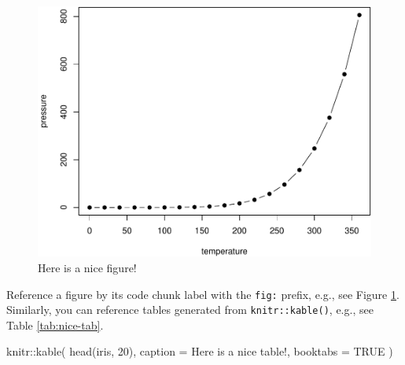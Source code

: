 \documentclass[
]{book}
\newenvironment{Shaded}{\begin{snugshade}}{\end{snugshade}}
\newcommand{\AttributeTok}[1]{\textcolor[rgb]{0.77,0.63,0.00}{#1}}
\newcommand{\ConstantTok}[1]{\textcolor[rgb]{0.00,0.00,0.00}{#1}}
\newcommand{\DecValTok}[1]{\textcolor[rgb]{0.00,0.00,0.81}{#1}}
\newcommand{\FunctionTok}[1]{\textcolor[rgb]{0.00,0.00,0.00}{#1}}
\newcommand{\NormalTok}[1]{#1}
\newcommand{\SpecialCharTok}[1]{\textcolor[rgb]{0.00,0.00,0.00}{#1}}
\newcommand{\StringTok}[1]{\textcolor[rgb]{0.31,0.60,0.02}{#1}}
\theoremstyle{definition}
\theoremstyle{definition}
\theoremstyle{definition}
\theoremstyle{definition}
\theoremstyle{remark}
\begin{document}
\begin{figure}

{\centering \includegraphics[width=0.8\linewidth]{bookdown-demo_files/figure-latex/nice-fig-1} 

}

\caption{Here is a nice figure!}\label{fig:nice-fig}
\end{figure}

Reference a figure by its code chunk label with the \texttt{fig:} prefix, e.g., see Figure \ref{fig:nice-fig}. Similarly, you can reference tables generated from \texttt{knitr::kable()}, e.g., see Table \ref{tab:nice-tab}.

\begin{Shaded}
\begin{Highlighting}[]
\NormalTok{knitr}\SpecialCharTok{::}\FunctionTok{kable}\NormalTok{(}
  \FunctionTok{head}\NormalTok{(iris, }\DecValTok{20}\NormalTok{), }\AttributeTok{caption =} \StringTok{\textquotesingle{}Here is a nice table!\textquotesingle{}}\NormalTok{,}
  \AttributeTok{booktabs =} \ConstantTok{TRUE}
\NormalTok{)}
\end{Highlighting}
\end{Shaded}
\end{document}
